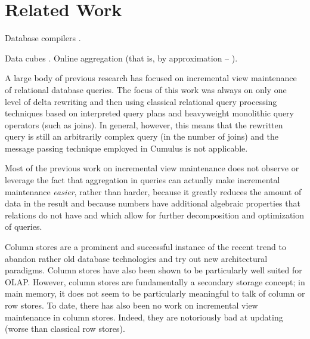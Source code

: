 

\section{Related Work}
\label{sec:relatedwork}


Database compilers \cite{DBLP:conf/pods/Batory88,DBLP:journals/jiis/BatoryT97}.

Data cubes \cite{datacube}.
Online aggregation (that is, by approximation --
\cite{DBLP:conf/sigmod/HaasH99, DBLP:conf/sigmod/RusuXPWJJD08, DBLP:conf/sigmod/AcharyaGPR99}).

A large body of previous research has focused on incremental view maintenance
of relational database queries. The
focus of this work was always on only one level of delta rewriting
and then using classical relational query processing techniques
based on interpreted query plans and heavyweight monolithic query operators
(such as joins).
In general, however, this means
that the rewritten query is still an arbitrarily complex query (in the number
of joins) and the message passing technique employed in Cumulus is not
applicable.

Most of the previous work on incremental view maintenance does not observe or leverage the fact that aggregation in queries can actually make incremental maintenance {\em easier}, rather than harder, because it greatly reduces the amount of data in the result and because numbers have additional algebraic properties that relations do not have and which allow for further decomposition and optimization of queries.

Column stores \cite{DBLP:journals/tods/Batory79,DBLP:conf/cidr/KerstenM05,DBLP:conf/vldb/StonebrakerMAHHH07}
are a prominent and successful instance of the recent trend
to abandon rather old database technologies and try out new architectural
para\-digms. Column stores have also been shown to be particularly well suited
for OLAP. However, column stores are fundamentally a secondary storage
concept; in main memory, it does not seem to be particularly meaningful to talk of column or row stores. To date, there has also been no work
on incremental view maintenance in column stores.
Indeed, they are notoriously bad at updating (worse than classical row stores).


